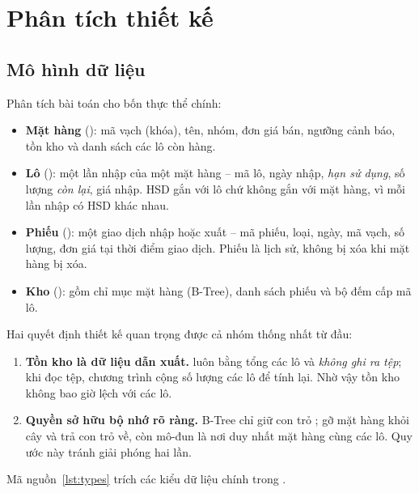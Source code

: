 \chapter{Phân tích thiết kế}\label{chap:thietke}

\section{Mô hình dữ liệu}

Phân tích bài toán cho bốn thực thể chính:

\begin{itemize}
  \item \textbf{Mặt hàng} (): mã vạch (khóa), tên, nhóm, đơn giá bán, ngưỡng cảnh báo,
        tồn kho và danh sách các lô còn hàng.
  \item \textbf{Lô} (): một lần nhập của một mặt hàng -- mã lô, ngày nhập, \emph{hạn sử dụng},
        số lượng \emph{còn lại}, giá nhập. HSD gắn với lô chứ không gắn với mặt hàng, vì mỗi lần nhập có HSD khác nhau.
  \item \textbf{Phiếu} (): một giao dịch nhập hoặc xuất -- mã phiếu, loại, ngày, mã vạch,
        số lượng, đơn giá tại thời điểm giao dịch. Phiếu là lịch sử, không bị xóa khi mặt hàng bị xóa.
  \item \textbf{Kho} (): gồm chỉ mục mặt hàng (B-Tree), danh sách phiếu và bộ đếm cấp mã lô.
\end{itemize}

Hai quyết định thiết kế quan trọng được cả nhóm thống nhất từ đầu:

\begin{enumerate}
  \item \textbf{Tồn kho là dữ liệu dẫn xuất.}  luôn bằng tổng  các lô và
        \emph{không ghi ra tệp}; khi đọc tệp, chương trình cộng số lượng các lô để tính lại. Nhờ vậy tồn kho không
        bao giờ lệch với các lô.
  \item \textbf{Quyền sở hữu bộ nhớ rõ ràng.} B-Tree chỉ giữ con trỏ ;  gỡ mặt hàng
        khỏi cây và trả con trỏ về, còn mô-đun  là nơi duy nhất  mặt hàng cùng các lô.
        Quy ước này tránh giải phóng hai lần.
\end{enumerate}

Mã nguồn~\ref{lst:types} trích các kiểu dữ liệu chính trong .

